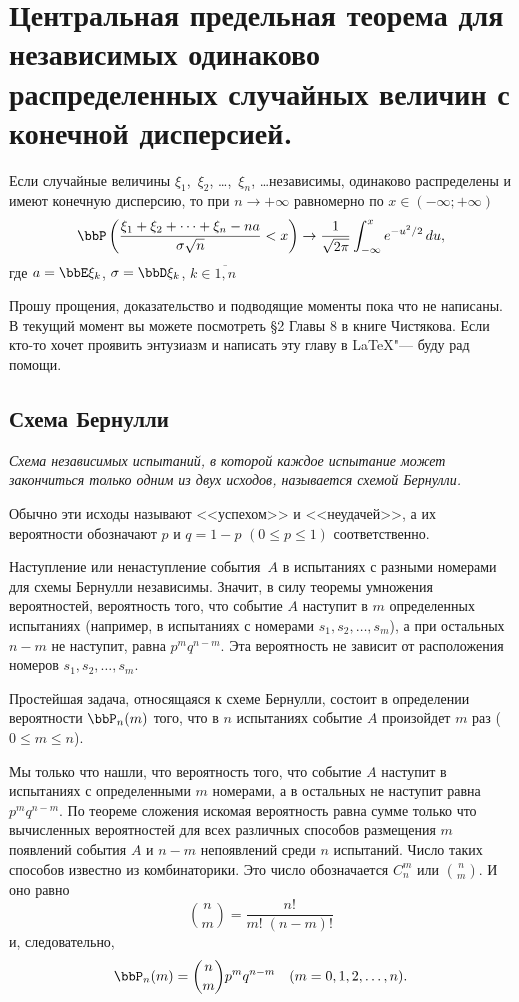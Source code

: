\chapter{Центральная предельная теорема для независимых одинаково распределенных случайных величин с конечной дисперсией.}

\begin{thm}
Если случайные величины $\xi_1$,~$\xi_2$, \dots,~$\xi_n$, \dots независимы, одинаково распределены и имеют конечную дисперсию, то при $n\to +\infty$ равномерно по $x\in(-\infty;+\infty)$
$$
\bbP \left(\frac{\xi_1+\xi_2+\dots+\xi_n -na}{\sigma \sqrt{n}} < x\right) \to \frac{1}{\sqrt{2\pi}}\int_{-\infty}^{x} e^{-u^2/2}\,du,
$$
где $a = \bbE \xi_k$, $\sigma = \bbD\xi_k$, $k\in\overline{1,n}$
\end{thm}

 Прошу прощения, доказательство и подводящие моменты пока что не написаны. В текущий момент вы можете посмотреть \S 2 Главы 8 в книге Чистякова. Если кто-то хочет проявить энтузиазм и написать эту главу в \LaTeX "--- буду рад помощи. 


\iffalse
\section{Схема Бернулли}

\textit{Схема независимых испытаний, в которой каждое испытание может закончиться только одним из двух исходов, называется схемой Бернулли.}

Обычно эти исходы называют <<успехом>> и <<неудачей>>, а их вероятности обозначают $p$ и $q = 1 - p$ $(0 \le p \le 1)$ соответственно.

Наступление или ненаступление события~$A$ в испытаниях с разными номерами для схемы Бернулли независимы. Значит, в силу теоремы умножения вероятностей, вероятность того, что событие $A$ наступит в $m$ определенных испытаниях (например, в испытаниях с номерами $s_1, s_2, \ldots, s_m$), а при остальных $n - m$ не наступит, равна $p^mq^{n - m}$. Эта вероятность не зависит от  расположения номеров $s_1, s_2, \ldots, s_m$.

Простейшая задача, относящаяся к схеме Бернулли, состоит в определении вероятности $\bbP_n(m)$ того, что в $n$ испытаниях событие $A$ произойдет $m$ раз ($0 \le m \le n$).

Мы только что нашли, что вероятность того, что событие $A$ наступит в испытаниях с определенными $m$ номерами, а в остальных не наступит равна $p^mq^{n - m}$. По теореме сложения искомая вероятность равна сумме только что вычисленных вероятностей для всех различных способов размещения $m$ появлений события $A$ и $n - m$ непоявлений среди $n$ испытаний. Число таких способов известно из комбинаторики. Это число обозначается  $C_n^m$ или $\binom n m $. И оно равно	
$$
\binom n m = \frac{n!}{m!\;(n - m)!}
$$
и, следовательно,
\begin{equation} \label{ch32.1.1eq1}
\bbP_n(m) = \binom n m p^mq^{n - m} \quad (m = 0,1,2,\ldots,n).
\end{equation}


